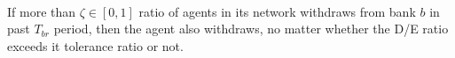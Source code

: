\begin{definition}
   \phantom{text} \\
   If more than $\zeta \in [0,1]$ ratio of agents in its network withdraws from bank $b$ in past $T_{br}$ period, then the agent also withdraws, no matter whether the D/E ratio exceeds it tolerance ratio or not.

\end{definition}
